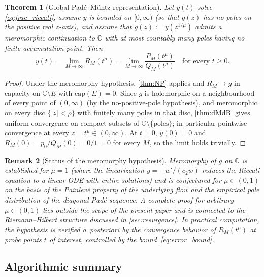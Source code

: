 \documentclass[11pt,a4paper]{article}
\newtheorem{theorem}{Theorem}[section]
\newtheorem{remark}[theorem]{Remark}
\newcommand{\C}{\mathbb{C}}
\begin{document}
\begin{theorem}[Global Pad\'e--M\"untz representation]\label{thm:pade_riccati}
Let \(y(t)\) solve \eqref{eq:frac_riccati}, assume \(y\) is bounded on \([0,\infty)\) (so that \(g(z)\) has no poles on the positive real \(z\)-axis), and assume that \(g(z):=y(z^{1/\mu})\) admits a meromorphic continuation to \(\C\) with at most countably many poles having no finite accumulation point.
Then
\begin{equation}\label{eq:y_global_pade}
\boxed{\,y(t)=\lim_{M\to\infty}R_M(t^\mu)=\lim_{M\to\infty}\frac{P_M(t^\mu)}{Q_M(t^\mu)}\quad\text{for every }t\ge0.\,}
\end{equation}
\end{theorem}

\begin{proof}
Under the meromorphy hypothesis, \cref{thm:NP} applies and \(R_M\to g\) in capacity on \(\C\setminus E\) with \(\mathrm{cap}(E)=0\).
Since \(g\) is holomorphic on a neighbourhood of every point of \((0,\infty)\) (by the no-positive-pole hypothesis), and meromorphic on every disc \(\{|z|<\rho\}\) with finitely many poles in that disc, \cref{thm:dMdB} gives uniform convergence on compact subsets of \(\C\setminus\{\text{poles}\}\); in particular pointwise convergence at every \(z=t^\mu\in(0,\infty)\).
At \(t=0\), \(y(0)=0\) and \(R_M(0)=p_0/Q_M(0)=0/1=0\) for every \(M\), so the limit holds trivially.
\end{proof}

\begin{remark}[Status of the meromorphy hypothesis]\label{rem:meromorphy}
Meromorphy of \(g\) on \(\C\) is established for \(\mu=1\) (where the linearization \(y=-w'/(c_2w)\) reduces the Riccati equation to a linear ODE with entire solutions) and is conjectured for \(\mu\in(0,1)\) on the basis of the Painlev\'e property of the underlying flow and the empirical pole distribution of the diagonal Pad\'e sequence.
A complete proof for arbitrary \(\mu\in(0,1)\) lies outside the scope of the present paper and is connected to the Riemann--Hilbert structure discussed in \cref{sec:resurgence}.
In practical computation, the hypothesis is verified a~posteriori by the convergence behavior of \(R_M(t^\mu)\) at probe points \(t\) of interest, controlled by the bound~\eqref{eq:error_bound}.
\end{remark}

\subsection{Algorithmic summary}
\end{document}
